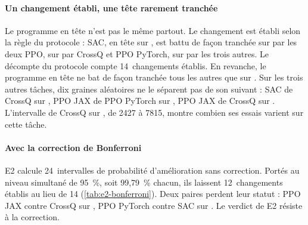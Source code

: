\paragraph{Un changement établi, une tête rarement tranchée}
Le programme en tête n'est pas le même partout. Le changement est établi selon la règle du protocole : SAC, en
tête sur , est battu de façon tranchée sur  par les deux PPO, sur
 par CrossQ et PPO PyTorch, sur  par les trois autres. Le décompte du protocole
compte 14~changements établis. En revanche, le programme en tête ne bat de façon tranchée tous les autres que sur
. Sur les trois autres tâches, dix graines aléatoires ne le séparent pas de son suivant : SAC de
CrossQ sur , PPO JAX de PPO PyTorch sur , PPO JAX de CrossQ sur
. L'intervalle de CrossQ sur , de \num{2427} à \num{7815}, montre combien ses
essais varient sur cette tâche.

\paragraph{Avec la correction de Bonferroni}
E2 calcule 24~intervalles de probabilité d'amélioration sans correction. Portés au niveau simultané de 95~\%,
soit 99,79~\% chacun, ils laissent 12~changements établis au lieu de 14 (\cref{tab:e2-bonferroni}).
Deux paires perdent leur statut : PPO JAX contre CrossQ sur , PPO PyTorch contre SAC sur
. Le verdict de E2 résiste à la correction.



